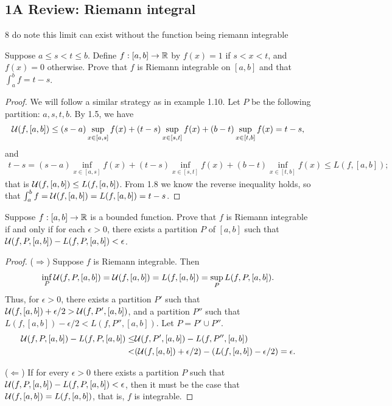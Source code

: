 \subsection{1A Review: Riemann integral}

8 do note this limit can exist without the function being riemann integrable

\begin{exercise}{2}
Suppose $a \leq s < t \leq b$.
Define $f:[a,b]\to\mathbb{R}$ by $f(x)=1$ if $s<x<t$, and $f(x)=0$ otherwise.
Prove that $f$ is Riemann integrable on $[a,b]$ and that $\int_a^b f = t-s$.
\end{exercise}
\begin{proof}
We will follow a similar strategy as in example 1.10.
Let $P$ be the following partition: $a,s,t,b$.
By 1.5, we have
\begin{align*}
    \mathcal{U}(f,[a,b])
    \leq (s-a)\sup_{x\in[a,s]} f(x) 
    + (t-s)\sup_{x\in[s,t]} f(x) 
    + (b-t)\sup_{x\in[t,b]} f(x)
    = t-s,
\end{align*}
and
\begin{align*}
    t-s
    =(s-a)\inf_{x\in[a,s]} f(x) 
    + (t-s)\inf_{x\in[s,t]} f(x) 
    + (b-t)\inf_{x\in[t,b]} f(x)
    \leq L(f,[a,b]);
\end{align*}
that is $\mathcal{U}(f,[a,b]) \leq L(f,[a,b])$.
From 1.8 we know the reverse inequality holds, so that $\int_a^b f = \mathcal{U}(f,[a,b]) = L(f,[a,b]) = t-s$.
\end{proof} 

\begin{exercise}{3}
Suppose $f:[a,b]\to\mathbb{R}$ is a bounded function. 
Prove that $f$ is Riemann integrable if and only if for each $\epsilon>0$, there exists a partition $P$ of $[a,b]$ such that $\mathcal{U}(f,P,[a,b]) - L(f,P,[a,b]) < \epsilon$.
\end{exercise}
\begin{proof}
($\Rightarrow$)
Suppose $f$ is Riemann integrable.
Then 
\begin{align*}
    \inf_P \mathcal{U}(f,P,[a,b]) = \mathcal{U}(f,[a,b]) = L(f,[a,b]) = \sup_P L(f,P,[a,b]).
\end{align*}
Thus, for $\epsilon>0$, there exists a partition $P'$ such that $\mathcal{U}(f,[a,b]) + \epsilon/2 > \mathcal{U}(f,P',[a,b])$, and a partition $P''$ such that $L(f,[a,b]) - \epsilon/2 < L(f,P'',[a,b])$.
Let $P = P' \cup P''$.
\begin{align*}
    \mathcal{U}(f,P,[a,b]) - L(f,P,[a,b]) 
    \leq& \mathcal{U}(f,P',[a,b]) - L(f,P'',[a,b])\\
    <& (\mathcal{U}(f,[a,b]) + \epsilon/2) 
    - (L(f,[a,b]) - \epsilon/2) = \epsilon.
\end{align*}

($\Leftarrow$)
If for every $\epsilon>0$ there exists a partition $P$ such that  $\mathcal{U}(f,P,[a,b]) - L(f,P,[a,b]) < \epsilon$, then it must be the case that $\mathcal{U}(f,[a,b]) = L(f,[a,b])$, that is, $f$ is integrable.
\end{proof} 

